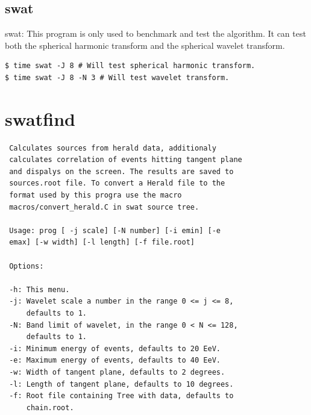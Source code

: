 \documentclass[12pt]{article}
\begin{document}
\subsection{swat}
swat: This program is only used to benchmark and test the algorithm. It can test
both the spherical harmonic transform and the spherical wavelet transform.
{\bf \color{brown}
\begin{lstlisting}
$ time swat -J 8 # Will test spherical harmonic transform.
$ time swat -J 8 -N 3 # Will test wavelet transform.
\end{lstlisting}
}

\appendix
\section{swatfind}
{\bf \color{brown}
   \begin{lstlisting}
 Calculates sources from herald data, additionaly
 calculates correlation of events hitting tangent plane
 and dispalys on the screen. The results are saved to
 sources.root file. To convert a Herald file to the
 format used by this progra use the macro
 macros/convert_herald.C in swat source tree.
 
 Usage: prog [ -j scale] [-N number] [-i emin] [-e
 emax] [-w width] [-l length] [-f file.root]

 Options:

 -h: This menu.
 -j: Wavelet scale a number in the range 0 <= j <= 8,
     defaults to 1.
 -N: Band limit of wavelet, in the range 0 < N <= 128,
     defaults to 1.
 -i: Minimum energy of events, defaults to 20 EeV.
 -e: Maximum energy of events, defaults to 40 EeV.
 -w: Width of tangent plane, defaults to 2 degrees.
 -l: Length of tangent plane, defaults to 10 degrees.
 -f: Root file containing Tree with data, defaults to
     chain.root.
   \end{lstlisting}
}
\newpage
\end{document}
